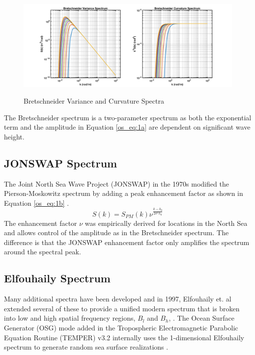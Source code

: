  \begin{figure}[H]
  \begin{center}
\includegraphics[width=6in]{../media/Ocean_Surface/bs_variance_curvature_spectrum.png}
  \end{center}
  \renewcommand{\baselinestretch}{1} \small\normalsize
  \begin{quote}
    \caption[Bretschneider Variance and Curvature Spectra]{Bretschneider Variance and Curvature Spectra\label{os_fig:1a}}
  \end{quote}
\end{figure}
 \renewcommand{\baselinestretch}{2} \small\normalsize
The Bretschneider spectrum is a two-parameter spectrum as both the exponential term and the amplitude in Equation \ref{os_eq:1a} are dependent on significant wave height.

\subsection{JONSWAP Spectrum}
The Joint North Sea Wave Project (JONSWAP) in the 1970s modified the Pierson-Moskowitz spectrum by adding a peak enhancement factor as shown in Equation \ref{os_eq:1b} \cite{michel_sea_spectra}.
\begin{equation}
  \label{os_eq:1b}
  S(k) = S_{PM}(k)\nu^{\frac{k-k_0}{2\sigma^2k_0}} 
  \end{equation}
The enhancement factor $\nu$ was empirically derived for locations in the North Sea and allows control of the amplitude as in the Bretschneider spectrum. The difference is that the JONSWAP enhancement factor only amplifies the spectrum around the spectral peak.

\subsection{Elfouhaily Spectrum}
Many additional spectra have been developed and in 1997, Elfouhaily et. al extended several of these to provide a unified modern spectrum that is broken into low and high spatial frequency regions, $B_l$ and $B_h$, \cite{elfouhaily}. The Ocean Surface Generator (OSG) mode added in the Tropospheric Electromagnetic Parabolic Equation Routine (TEMPER) v3.2 internally uses the 1-dimensional Elfouhaily spectrum to generate random sea surface realizations \cite{temper_guide}.

